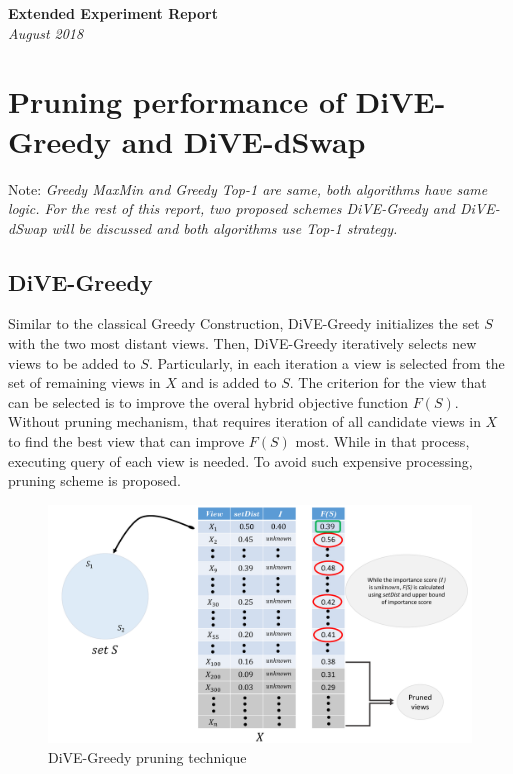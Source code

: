 \documentclass{article}
\begin{document}
\begin{titlepage}
	\begin{center}
		\Large\textbf{Extended Experiment Report}\\
		\large\textit{August 2018}
	\end{center}
\end{titlepage}

\section{Pruning performance of DiVE-Greedy and DiVE-dSwap}

Note: \textit{Greedy MaxMin and Greedy Top-1 are same, both algorithms have same logic. For the rest of this report, two proposed schemes DiVE-Greedy and DiVE-dSwap will be discussed and both algorithms use Top-1 strategy.} 

\subsection{DiVE-Greedy}
Similar to the classical Greedy Construction, DiVE-Greedy initializes the set $S$ with the two most distant views.
%
Then, DiVE-Greedy iteratively selects new views to be added to $S$. 
%
Particularly, in each iteration a view is selected from the set of remaining views in $X$ and is added to $S$.
%
The criterion for the view that can be selected is to improve the overal hybrid objective function $F(S)$. 
%
Without pruning mechanism, that requires iteration of all candidate views in $X$ to find the best view that can improve $F(S)$ most. While in that process, executing query of each view is needed. 
%
To avoid such expensive processing, pruning scheme is proposed. 
%

\begin{figure}
	\begin{center}
		\includegraphics[width=6.0in]{figures/DiVE-Greedy}
		\vspace{-12pt}
		\caption{DiVE-Greedy pruning technique}
		\label{fig:DiVE-Greedy}
		\vspace{-20pt}
	\end{center}
\end{figure}
\end{document}

